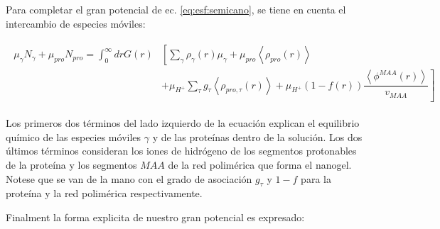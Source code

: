 Para completar el gran potencial de ec. \ref{eq:esf:semicano}, se tiene en cuenta el intercambio de especies m\'oviles:
 

\begin{align}
	\begin{aligned}
		\mu_\gamma N_\gamma + \mu_{pro} N_{pro} =\int_0^\infty drG(r)&\left[\sum_{\gamma }{\rho_\gamma(r)\mu_\gamma}
		+ \mu_{pro} \left<\rho_{pro}(r)\right> \right. \\
		& \left. +\mu_{H^+}\sum_{\tau}{g_\tau\left<\rho_{pro,\tau}(r)\right> } +\mu_{H^+}(1-f(r))\dfrac{\left<\phi^{MAA}(r)\right>}{v_{MAA}}\right]
	\end{aligned}
\end{align}


Los primeros dos t\'erminos del lado izquierdo de la ecuaci\'on explican el equilibrio qu\'imico de las especies m\'oviles $\gamma$ y de las prote\'inas dentro de la soluci\'on.
Los dos \'ultimos t\'erminos consideran los iones de hidr\'ogeno de los segmentos protonables de la prote\'ina y los segmentos $MAA$ de la red polim\'erica que forma el nanogel. Notese que se van de la mano con el grado de asociaci\'on $g_\tau$ y $1-f$ para la prote\'ina y la red polim\'erica respectivamente.


Finalment la forma explicita de nuestro gran potencial es expresado:

